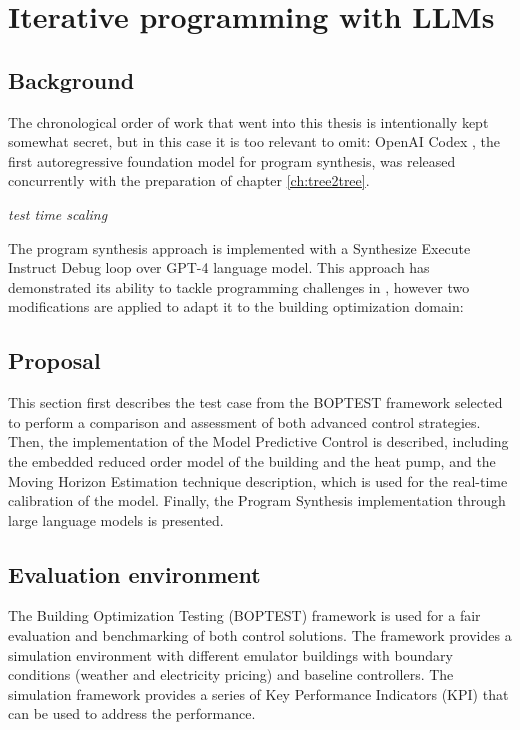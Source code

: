 \chapter{Iterative programming with LLMs}
\label{ch:boptest}

\section{Background}

The chronological order of work that went into this thesis is intentionally kept somewhat secret, but in this case it is too relevant to omit: OpenAI Codex \cite{chenEvaluatingLargeLanguage2021}, the first autoregressive foundation model for program synthesis, was released concurrently with the preparation of chapter \ref{ch:tree2tree}.

\emph{test time scaling}

The program synthesis approach is implemented with a Synthesize Execute Instruct Debug loop over GPT-4 \cite{GPT2023} language model. This approach has demonstrated its ability to tackle programming challenges in \cite{Reflexion2023,teaching2023,Fully2023}, however two modifications are applied to adapt it to the building optimization domain:



\newpage
\section{Proposal}
This section first describes the test case from the BOPTEST framework selected to perform a comparison and assessment of both advanced control strategies. Then, the implementation of the Model Predictive Control is described, including the embedded reduced order model of the building and the heat pump, and the Moving Horizon Estimation technique description, which is used for the real-time calibration of the model. Finally, the Program Synthesis implementation through large language models is presented.

\newpage
\section{Evaluation environment}
\label{sec:BOPTEST}
The Building Optimization Testing (BOPTEST) framework \cite{Blum2021} is used for a fair evaluation and benchmarking of both control solutions. The framework provides a simulation environment with different emulator buildings with boundary conditions (weather and electricity pricing) and baseline controllers. The simulation framework provides a series of Key Performance Indicators (KPI) that can be used to address the performance.

